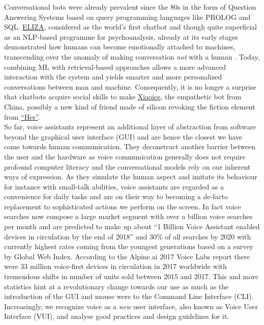 Conversational bots were already prevalent since the 80s in the form of Question Answering Systems based on query programming languages like PROLOG and SQL.
\href{https://en.wikipedia.org/wiki/ELIZA}{ELIZA}, considered as the world's first chatbot and though quite superficial as an NLP-based programme for psychoanalysis, already at its early stages demonstrated how humans can become emotionally attached to machines, transcending over the anomaly of making conversation \textit{not} with a human \cite{Weizenbaum1976}.
Today, combining ML with retrieval-based approaches allows a more advanced interaction with the system and yields smarter and more personalized conversations between man and machine.
Consequently, it is no longer a surprise that chatbots acquire social skills to make \href{https://en.wikipedia.org/wiki/Xiaoice}{Xiaoice}, the empathetic bot from China, possibly a new kind of friend made of silicon revoking the fiction element from \hyperlink{hermovie}{``Her''}.\\ 

So far, voice assistants represent an additional layer of abstraction from software beyond the graphical user interface (GUI) and are hence the closest we have come towards human communication.
They deconstruct another barrier between the user and the hardware as voice communication generally does not require profound computer literacy and the conversational models rely on our inherent ways of expression.
As they simulate the human aspect and imitate its behaviour for instance with small-talk abilities\cite{hiddenbrainpod}, voice assistants are regarded as a convenience for daily tasks and are on their way to becoming a de-facto replacement to sophisticated actions we perform on the screen.
In fact voice searches now compose a large market segment with over a billion voice searches per month \cite{voicelabs:trends}
and are predicted to make up about
``1 Billion Voice Assistant enabled devices in circulation by the end of 2018''\cite{voicelabs:trends} and 
30\% \cite{gartnerpreds17}\cite{searchblog}
of all searches by 2020 with currently highest rates coming from the youngest generations based on a survey\cite{globalwebindex} by Global Web Index. 
According to the Alpine.ai 2017 Voice Labs report there were 33 million voice-first devices in circulation in 2017 worldwide \cite{voicelabs} with tremendous shifts in number of units sold between 2015 and 2017.
This and more statistics hint at a revolutionary change towards our use as much as the introduction of the GUI and mouse were to the Command Line Interface (CLI).
Increasingly, we recognize voice as a \textit{new} user interface, also known as Voice User Interface (VUI), and analyse good practices and design guidelines for it.\\

